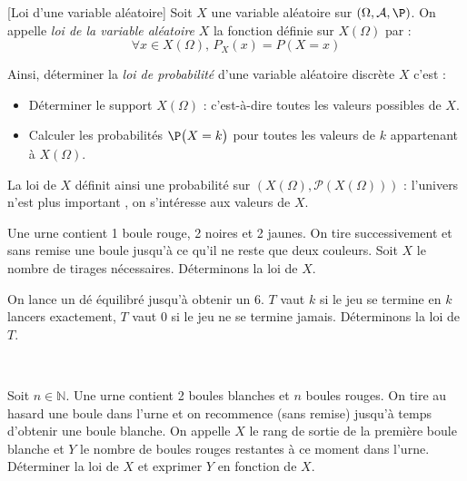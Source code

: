\documentclass[french,11pt,twoside]{VcCours}
\begin{document}
\begin{Definition}{}[Loi d'une variable aléatoire]
Soit $X$ une variable aléatoire sur $(\Omega, \mathcal{A}, \P)$. On appelle \emph{loi de la variable aléatoire} $X$ la fonction définie sur $X(\Omega)$ par :
$$ \forall x \in X(\Omega), \, P_X(x) = P(X=x)$$
\end{Definition}

Ainsi, déterminer la \emph{loi de probabilité} d'une variable aléatoire discrète $X$ c'est : 
 \begin{itemize}
  \item Déterminer le support $X(\Omega)$ : c'est-à-dire toutes les valeurs possibles de $X$.
  \item Calculer les probabilités $\P\big(X=k\big)$ pour toutes les valeurs de $k$ appartenant à $X(\Omega)$.
 \end{itemize}

\medskip

\begin{Remarque}{} La loi de $X$ définit ainsi une probabilité sur $(X(\Omega), \mathcal{P}(X(\Omega)))$ : l'univers n'est \og plus important \fg, on s'intéresse aux valeurs de $X$.
\end{Remarque}

\begin{Exemple}{} Une urne contient 1 boule rouge, 2 noires et 2 jaunes. On tire successivement et sans remise une boule jusqu'à ce qu'il ne reste que deux couleurs. Soit $X$ le nombre de tirages nécessaires. Déterminons la loi de $X$.

\vspace{10cm}
\end{Exemple}

\begin{Exemple}{} On lance un dé équilibré jusqu'à obtenir un 6. $T$ vaut $k$ si le jeu se termine en $k$ lancers exactement, $T$ vaut 0 si le jeu ne se termine jamais. Déterminons la loi de $T$.

\vspace{10cm}
\end{Exemple} 

\newpage

$\phantom{test}$

\vspace{6cm}

\begin{ApplicationDirecte}{} Soit $n \in \mathbb{N}$. Une urne contient 2 boules blanches et $n$ boules rouges. On tire au hasard une boule dans l'urne et on recommence (sans remise) jusqu'à temps d'obtenir une boule blanche. On appelle $X$ le rang de sortie de la première boule blanche et $Y$ le nombre de boules rouges restantes à ce moment dans l'urne. Déterminer la loi de $X$ et exprimer $Y$ en fonction de $X$.
\end{ApplicationDirecte} 
\end{document}
